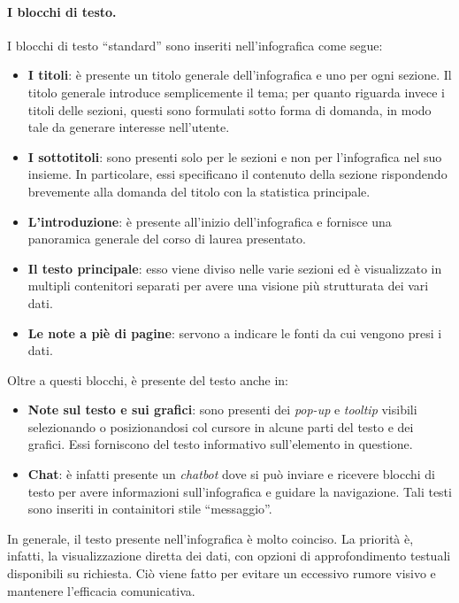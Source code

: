 \paragraph{I blocchi di testo.} I blocchi di testo ``standard'' sono inseriti nell'infografica come segue:
\begin{itemize}
    \item \textbf{I titoli}: è presente un titolo generale dell'infografica e uno per ogni sezione. Il titolo generale introduce semplicemente il tema; per quanto riguarda invece
    i titoli delle sezioni, questi sono formulati sotto forma di domanda, in modo tale da generare interesse nell'utente.
    \item \textbf{I sottotitoli}: sono presenti solo per le sezioni e non per l'infografica nel suo insieme. In particolare, essi specificano il contenuto della sezione rispondendo
    brevemente alla domanda del titolo con la statistica principale.
    \item \textbf{L'introduzione}: è presente all'inizio dell'infografica e fornisce una panoramica generale del corso di laurea presentato.
    \item \textbf{Il testo principale}: esso viene diviso nelle varie sezioni ed è visualizzato in multipli contenitori separati per avere una visione più strutturata dei vari dati.
    \item \textbf{Le note a piè di pagine}: servono a indicare le fonti da cui vengono presi i dati. 
\end{itemize}
Oltre a questi blocchi, è presente del testo anche in:
\begin{itemize}
    \item \textbf{Note sul testo e sui grafici}: sono presenti dei \emph{pop-up} e \emph{tooltip} visibili selezionando o posizionandosi col cursore in alcune parti del testo e dei grafici. Essi forniscono 
    del testo informativo sull'elemento in questione.
    \item \textbf{Chat}: è infatti presente un \emph{chatbot} dove si può inviare e ricevere blocchi di testo per avere informazioni sull'infografica e guidare la navigazione. Tali testi sono 
    inseriti in containitori stile ``messaggio''.
\end{itemize}
In generale, il testo presente nell'infografica è molto coinciso.
La priorità è, infatti, la visualizzazione diretta dei dati, con opzioni di approfondimento testuali disponibili su richiesta. 
Ciò viene fatto per evitare un eccessivo rumore visivo e mantenere l'efficacia comunicativa.

